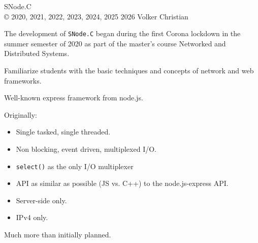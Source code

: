 ﻿%




\begin{frame}{}
   \begin{center}
     \alert{\Huge \color{fh-ooe-red} SNode.C}\\\scriptsize\copyright{} 2020, 2021, 2022, 2023, 2024, 2025 2026 Volker Christian\\
     \href{https://github.com/SNodeC/snode.c}{} \href{https://www.gnu.org/licenses /lgpl-3.0.en.html}{}
   \end{center}
   The development of \texttt{SNode.C} began during the first Corona lockdown in the summer semester of 2020 as part of the master's course \alert{Networked and
     Distributed Systems}.
   \begin{description}
     \item [\alert{Goal}] Familiarize students with the basic \alert{techniques and concepts of network and web frameworks}.
     \item [\alert{Role Model}] Well-known \alert{express} framework from \alert{node.js}.
     \item [\alert{Design Decision}] Originally:
     \begin{itemize}
       \item Single tasked, single threaded.
       \item Non blocking, event driven, multiplexed I/O.
       \item \texttt{select()} as the only I/O multiplexer
       \item API as similar as possible (JS vs. C++) to the node.js-express API.
       \item \alert{Server-side} only.
       \item \alert{IPv4} only.
     \end{itemize}
     \item [\alert{Current Status}] Much more than initially planned.
   \end{description}
\end{frame}
